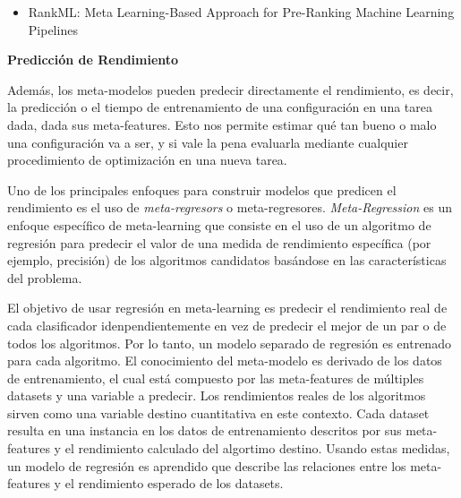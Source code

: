 \begin{itemize}
	\item RankML: Meta Learning-Based Approach for Pre-Ranking Machine Learning Pipelines
\end{itemize}

%
%

\quad

\textbf{Predicción de Rendimiento}


\quad

Además, los meta-modelos pueden predecir directamente el rendimiento, es decir, la predicción o el tiempo de entrenamiento de una configuración en una tarea dada, dada sus meta-features. Esto nos permite estimar qué tan bueno o malo una configuración va a ser, y si vale la pena evaluarla mediante cualquier procedimiento de optimización en una nueva tarea.

Uno de los principales enfoques para construir modelos que predicen el rendimiento es el uso de \textit{meta-regresors} o meta-regresores. \textit{Meta-Regression} es un enfoque específico de meta-learning que consiste en el uso de un algoritmo de regresión para predecir el valor de una medida de rendimiento específica (por ejemplo, precisión) de los algoritmos candidatos basándose en las características del problema. 

El objetivo de usar regresión en meta-learning es predecir el rendimiento real de cada clasificador idenpendientemente en vez de predecir el mejor de un par o de todos los algoritmos. Por lo tanto, un modelo separado de regresión es entrenado para cada algoritmo. El conocimiento del meta-modelo es derivado de los datos de entrenamiento, el cual está compuesto por las meta-features de múltiples datasets y una variable a predecir. Los rendimientos reales de los algoritmos sirven como una variable destino cuantitativa en este contexto. Cada dataset resulta en una instancia en los datos de entrenamiento descritos por sus meta-features y el rendimiento calculado del algortimo destino. Usando estas medidas, un modelo de regresión es aprendido que describe las relaciones entre los meta-features y el rendimiento esperado de los datasets.

